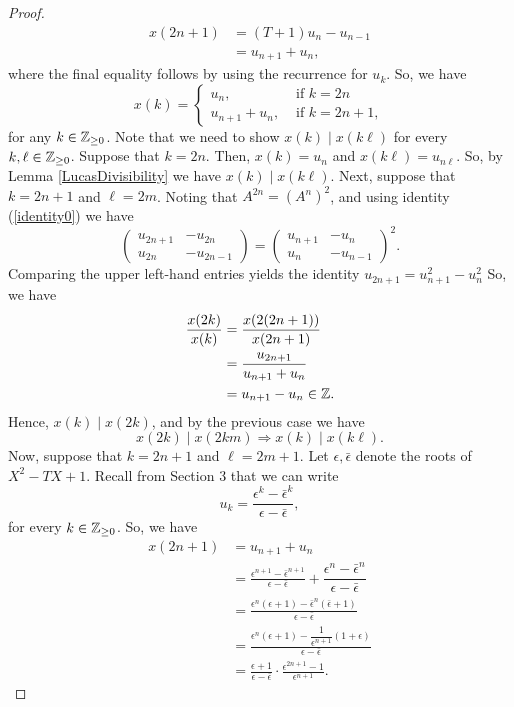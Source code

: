 \documentclass[11pt]{amsart}
\begin{document}
\begin{prop}
\begin{proof}
\begin{align*}
x(2n+1)	&=(T+1)u_n-u_{n-1}\\
		& =u_{n+1} +u_n,
\end{align*}
where the final equality follows by using the recurrence for $u_k$. So, we have
\[x(k)=\begin{cases} u_n, & \text{ if } k=2n \\ u_{n+1}+u_{n}, & \text{ if } k=2n+1, \end{cases}\]
for any $k \in \mathbb{Z}_{\geq 0}$. 
Note that we need to show $x(k) \mid x(k\ell)$ for every $k, \ell \in \mathbb{Z}_{\geq 0}$. Suppose that $k=2n$. Then, $x(k)=u_n$ and $x(k\ell)=u_{n\ell}$. So, by Lemma \ref{LucasDivisibility} we have $x(k) \mid x(k \ell)$. Next, suppose that $k=2n+1$ and $\ell=2m$.
Noting that $A^{2n}=(A^n)^2$, and using identity (\ref{identity0}) we have
\[\begin{pmatrix} u_{2n+1} & -u_{2n} \\ u_{2n} & - u_{2n-1} \end{pmatrix}=\begin{pmatrix} u_{n+1} & -u_n \\ u_n & -u_{n-1} \end{pmatrix}^2.\]
Comparing the upper left-hand entries yields the identity
$
u_{2n+1}=u^2_{n+1}-u_n^2
$
So, we have
\begin{align*}
\frac{x(2k)}{x(k)}	&=\frac{x(2(2n+1))}{x(2n+1)}\\
			&=\frac{u_{2n+1}}{u_{n+1}+u_n}\\
			&=u_{n+1}- u_{n} \in \mathbb{Z}.
\end{align*}
Hence, $x(k) \mid x(2k)$, and by the previous case we have
\[x(2k) \mid x(2km) \Rightarrow x(k) \mid x(k\ell).\] 
Now, suppose that $k=2n+1$ and $\ell=2m+1$. Let $\epsilon, \bar{\epsilon}$ denote the roots of $X^2-TX+1$. Recall from Section 3 that we can write
\[u_k=\frac{\epsilon^k - \bar{\epsilon}^k}{\epsilon-\bar{\epsilon}},\]
for every $k \in \mathbb{Z}_{\geq 0}$. So, we have
\begin{align*}
x(2n+1)	& =  u_{n+1}+u_{n}\\
		&= \frac{\epsilon^{n+1}-\bar{\epsilon}^{n+1}}{\epsilon -\bar{\epsilon}} + \dfrac{\epsilon^n - \bar{\epsilon}^n}{\epsilon-\bar{\epsilon}}\\
		&= \frac{\epsilon^n(\epsilon+1)-\bar{\epsilon}^n(\bar{\epsilon}+1)}{\epsilon-\bar{\epsilon}}\\
		&= \frac{\epsilon^n(\epsilon+1)-\dfrac{1}{\epsilon^{n+1}} (1+\epsilon)}{\epsilon-\bar{\epsilon}}\\
		&=\frac{\epsilon+1}{\epsilon-\bar{\epsilon}} \cdot \frac{\epsilon^{2n+1}-1}{\epsilon^{n+1}}.
\end{align*}


\end{proof}
\end{prop}
\end{document}
